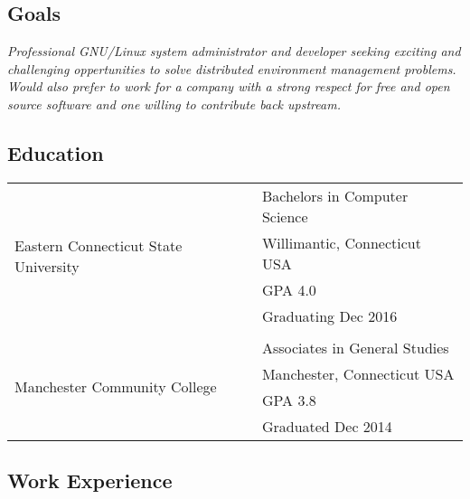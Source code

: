 \documentclass[10pt,letterpaper,]{article}
\author{Anthony DeDominic\\anthony@dedominic.pw\\REDACTED LOCATION\\REDACTED PHONE}
\date{}
\begin{document}

\subsection{Goals}\label{goals}

\emph{Professional GNU/Linux system administrator and developer seeking
exciting and challenging oppertunities to solve distributed environment
management problems. Would also prefer to work for a company with
a strong respect for free and open source software and one willing to
contribute back upstream.}

\subsection{Education}\label{education}

\begin{center}
\begin{tabular}{l|l}
    \multirow{4}{*}{Eastern Connecticut State University} & Bachelors in Computer Science \\
    & Willimantic, Connecticut USA \\
    & GPA 4.0 \\
    & Graduating Dec 2016 \\
& \\
    \multirow{4}{*}{Manchester Community College} & Associates in General Studies \\
    & Manchester, Connecticut USA \\
    & GPA 3.8 \\
    & Graduated Dec 2014 \\
\end{tabular}
\end{center}

\subsection{Work Experience}\label{work-experience}
\end{document}
